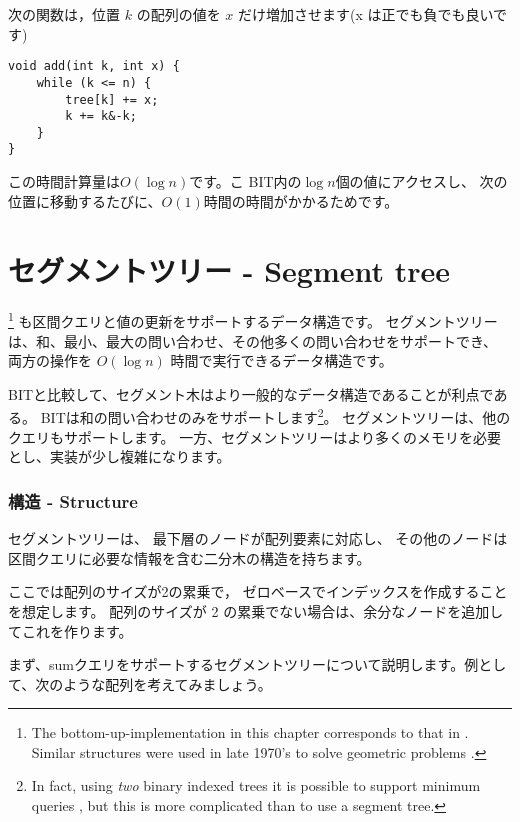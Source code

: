 次の関数は，位置 $k$ の配列の値を $x$ だけ増加させます(x は正でも負でも良いです)
\begin{lstlisting}
void add(int k, int x) {
    while (k <= n) {
        tree[k] += x;
        k += k&-k;
    }
}
\end{lstlisting}

この時間計算量は$O(\log n)$です。こ
BIT内の$\log n$個の値にアクセスし、
次の位置に移動するたびに、$O(1)$時間の時間がかかるためです。

\section{セグメントツリー - Segment tree}


\footnote{The bottom-up-implementation in this chapter corresponds to
that in \cite{sta06}. Similar structures were used
in late 1970's to solve geometric problems \cite{ben80}.}
も区間クエリと値の更新をサポートするデータ構造です。
セグメントツリーは、和、最小、最大の問い合わせ、その他多くの問い合わせをサポートでき、
両方の操作を $O(\log n)$  時間で実行できるデータ構造です。

BITと比較して、セグメント木はより一般的なデータ構造であることが利点である。
BITは和の問い合わせのみをサポートします\footnote{In fact, using \emph{two} binary
indexed trees it is possible to support minimum queries \cite{dim15},
but this is more complicated than to use a segment tree.}。
セグメントツリーは、他のクエリもサポートします。
一方、セグメントツリーはより多くのメモリを必要とし、実装が少し複雑になります。

\subsubsection{構造 - Structure}

セグメントツリーは、
最下層のノードが配列要素に対応し、
その他のノードは区間クエリに必要な情報を含む二分木の構造を持ちます。

ここでは配列のサイズが2の累乗で，
ゼロベースでインデックスを作成することを想定します。
配列のサイズが 2 の累乗でない場合は、余分なノードを追加してこれを作ります。

まず、sumクエリをサポートするセグメントツリーについて説明します。例として、次のような配列を考えてみましょう。

